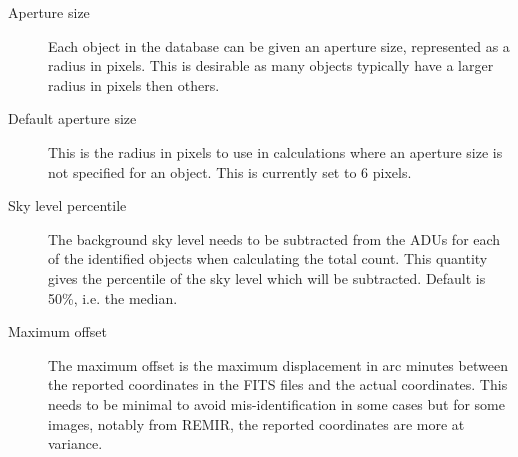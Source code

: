 \begin{description}
\item[Aperture size] Each object in the database can be given an aperture size, represented as a radius in pixels. This
  is desirable as many objects typically have a larger radius in pixels then others.
\item[Default aperture size] This is the radius in pixels to use in calculations where an aperture size is not specified
  for an object. This is currently set to 6 pixels.
  \item[Sky level percentile] The background sky level needs to be subtracted from the ADUs for each of the identified
    objects when calculating the total count. This quantity gives the percentile of the sky level which will be
    subtracted. Default is 50\%, i.e. the median.
    \item[Maximum offset] The maximum offset is the maximum displacement in arc minutes between the reported coordinates
      in the FITS files and the actual coordinates. This needs to be minimal to avoid mis-identification in some cases
      but for some images, notably from REMIR, the reported coordinates are more at variance.
\end{description}
